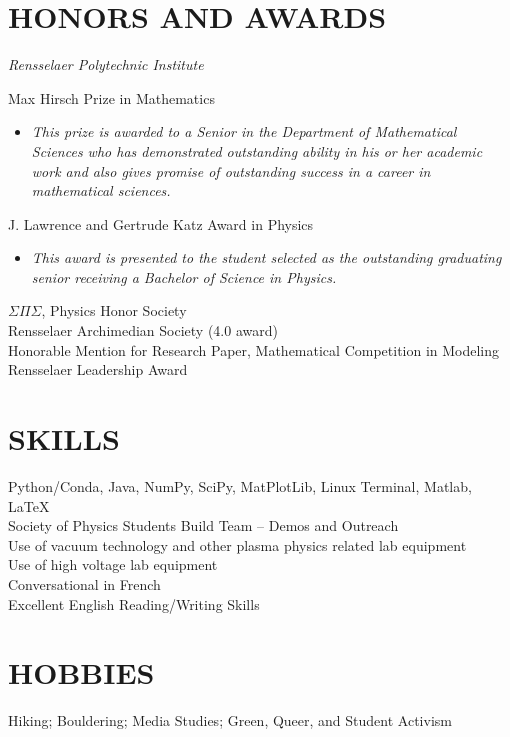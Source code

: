 \documentclass[margin]{rpires}
\begin{document}
\begin{resume}
    
\section{HONORS AND AWARDS} {\sl Rensselaer Polytechnic Institute}

                Max Hirsch Prize in Mathematics
                \begin{itemize}
                    \item[] {\sl This prize is awarded to a Senior in the Department of Mathematical Sciences who has demonstrated outstanding ability in his or her academic work and also gives promise of outstanding success in a career in mathematical sciences.}
                \end{itemize}
                \vspace{-0.4cm}
                J. Lawrence and Gertrude Katz Award in Physics
                \begin{itemize} 
                    \item[] {\sl This award is presented to the student selected as the outstanding graduating senior receiving a Bachelor of Science in Physics.}
                \end{itemize}
                \vspace{-0.4cm}
                $\Sigma \Pi \Sigma$, Physics Honor Society \\
                Rensselaer Archimedian Society (4.0 award) \\
                Honorable Mention for Research Paper,       Mathematical Competition in Modeling \\
                Rensselaer Leadership Award 
 
\section{SKILLS}
Python/Conda, Java, NumPy, SciPy, MatPlotLib, Linux Terminal, Matlab, \LaTeX\\
Society of Physics Students Build Team – Demos and Outreach \\
Use of vacuum technology and other plasma physics related lab equipment\\
Use of high voltage lab equipment\\
Conversational in French\\
Excellent English Reading/Writing Skills \\

 
\section{HOBBIES}
Hiking; Bouldering; Media Studies; Green, Queer, and Student Activism
 
\end{resume} 
\end{document}

